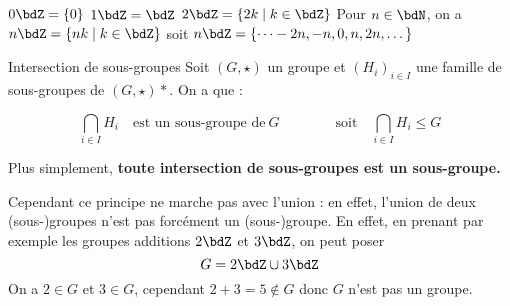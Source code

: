 \documentclass[a4paper,french,bookmarks]{article}
\begin{document}
\begin{example}{}{}
    \begin{multicols}{2}
        \begin{enumerate}
            \ithand $0\bdZ = \{0\}$
            \ithand $1\bdZ = \bdZ$
            \ithand $2\bdZ = \{ 2k \mid k \in \bdZ\}$
            \ithand Pour $n \in \bdN$, on a $n\bdZ = \{nk \mid k \in \bdZ\}$ soit
            $n\bdZ = \{\dots -2n, -n, 0, n, 2n, \dots\}$
        \end{enumerate}
    \end{multicols}
\end{example}

\begin{theorem}{Intersection de sous-groupes}{}
    Soit $(G, \star)$ un groupe et $(H_i)_{i \in I}$ une famille de sous-groupes de $(G, \star)*$. On a que :
    
    \[ \bigcap_{i \in I} H_i \quad \text{est un sous-groupe de} \ G \qquad\qquad\text{soit}\quad \bigcap_{i \in I} H_i \leq G\]
    
    Plus simplement, \bf{toute intersection de sous-groupes est un sous-groupe.}
\end{theorem}


Cependant ce principe ne marche pas avec l'union : en effet, l'union de deux (sous-)groupes n'est pas forcément un (sous-)groupe. En effet, en prenant par exemple les groupes additions $2\bdZ$ et $3\bdZ$, on peut poser
\[ G = 2\bdZ \cup 3 \bdZ\]
On a $2 \in G$ et $3 \in G$, cependant $2 + 3 = 5 \not\in G$ donc $G$ n'est pas un groupe.
\end{document}
